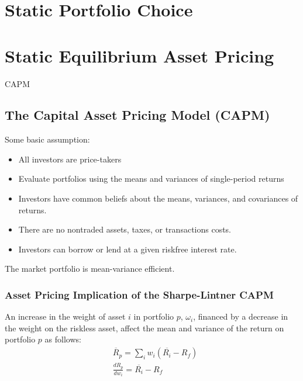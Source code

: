 \documentclass[11pt,green,twocol,citestyle=authoryear, bibstyle=authoryear]{elegantbook}
\begin{document}
\chapter{Static Portfolio Choice}

\chapter{Static Equilibrium Asset Pricing}

\begin{introduction}
    \item CAPM
\end{introduction}

\section{The Capital Asset Pricing Model (CAPM)}

Some basic assumption:
\begin{itemize}
    \item All investors are price-takers
    \item Evaluate portfolios using the means and variances of single-period returns
    \item Investors have common beliefs about the means, variances, and covariances of returns.
    \item There are no nontraded assets, taxes, or transactions costs.
    \item Investors can borrow or lend at a given riskfree interest rate.
\end{itemize}

\begin{note}
    The market portfolio is mean-variance efficient.
\end{note}

\subsection{Asset Pricing Implication of the Sharpe-Lintner CAPM}

An increase in the weight of asset $ i $ in portfolio $ p $, $ \omega_i $, financed by a decrease in the weight on the riskless asset, affect the mean and variance of the return on portfolio $ p $ as follows:
\begin{equation}\label{equ:3.1}
    \begin{aligned}
        &\overline{R}_p=\sum_i w_i\left(\overline{R_{i}}-R_f\right) \\
        &\frac{d R_p }{d w_i}=\overline{R_i}-R_f
        \end{aligned}
\end{equation}  
\end{document}
